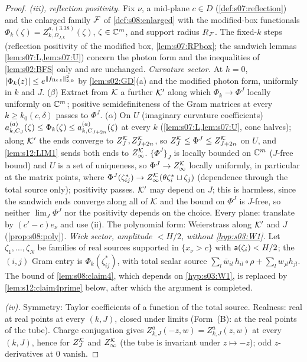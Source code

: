 \begin{proof}
\emph{(iii), reflection positivity.} Fix $\nu$, a mid-plane $c\in D$ (\cref{def:s07:reflection}) and the enlarged family $\mathcal F$ of \cref{def:s08:enlarged} with the modified-box functionals $\Phi_k(\zeta)=Z^{a,(3.38)}_{k,\Omega_{J,k}}(\zeta)$, $\zeta\in\mathbb C^m$, and support radius $R_{\mathcal F}$. The fixed-$k$ steps (reflection positivity of the modified box, \cref{lem:s07:RPbox}; the sandwich lemmas \cref{lem:s07:L,lem:s07:U}) concern the photon form and the inequalities of \cref{lem:s02:BFS} only and are unchanged. \emph{Curvature sector.} At $h=0$, $|\Phi_k(z)|\le e^{\lVert f_{\operatorname{Re} z}\rVert^2_{2,k}}$ by \cref{lem:s02:GD}(a) and the modified photon form, uniformly in $k$ and $J$. ($\beta$) Extract from $\mathcal K$ a further $\mathcal K'$ along which $\Phi_k\to\Phi^J$ locally uniformly on $\mathbb C^m$; positive semidefiniteness of the Gram matrices at every $k\ge k_0(c,\delta)$ passes to $\Phi^J$. ($\alpha$) On $U$ (imaginary curvature coefficients) $a^{(a)}_{k,C_J}(\zeta)\le\Phi_k(\zeta)\le a^{(a)}_{k,C_{J+2n}}(\zeta)$ at every $k$ (\cref{lem:s07:L,lem:s07:U}, cone halves); along $\mathcal K'$ the ends converge to $Z^{\mathcal K}_J,Z^{\mathcal K}_{J+2n}$, so $Z^{\mathcal K}_J\le\Phi^J\le Z^{\mathcal K}_{J+2n}$ on $U$, and \cref{lem:s12:LIM1} sends both ends to $Z^{\mathcal K}_{\infty}$. $\{\Phi^J\}_J$ is locally bounded on $\mathbb C^m$ ($J$-free bound) and $U$ is a set of uniqueness, so $\Phi^J\to Z^{\mathcal K}_{\infty}$ locally uniformly, in particular at the matrix points, where $\Phi^J(\zeta^*_{ij})\to Z^{\mathcal K}_{\infty}(\theta\zeta^*_i\sqcup\zeta_j)$ (dependence through the total source only); positivity passes. $\mathcal K'$ may depend on $J$; this is harmless, since the sandwich ends converge along all of $\mathcal K$ and the bound on $\Phi^J$ is $J$-free, so neither $\lim_J\Phi^J$ nor the positivity depends on the choice. Every plane: translate by $(c'-c)e_\nu$ and use (ii). The polynomial form: Weierstrass along $\mathcal K'$ and $J$ (\cref{prop:s08:poly}). \emph{Wick sector, amplitude $<H/2$, without \cref{hyp:s03:W1}.} Let $\zeta_1,\dots,\zeta_N$ be families of real sources supported in $\{x_\nu>c\}$ with $\mathsf a(\zeta_i)<H/2$; the $(i,j)$ Gram entry is $\Phi_k(\zeta^*_{ij})$, with total scalar source $\sum_l\bar w_{il}\,h_{il}\circ\rho+\sum_lw_{jl}h_{jl}$. The bound of \cref{lem:s08:claim4}, which depends on \cref{hyp:s03:W1}, is replaced by \cref{lem:s12:claim4prime} below, after which the argument is completed.

\emph{(iv).} Symmetry: Taylor coefficients of a function of the total source. Realness: real at real points at every $(k,J)$, closed under limits (Form~(B): at the real points of the tube). Charge conjugation gives $Z^a_{k,J}(-z,w)=Z^a_{k,J}(z,w)$ at every $(k,J)$, hence for $Z^{\mathcal K}_J$ and $Z^{\mathcal K}_{\infty}$ (the tube is invariant under $z\mapsto-z$); odd $z$-derivatives at $0$ vanish.


\end{proof}
